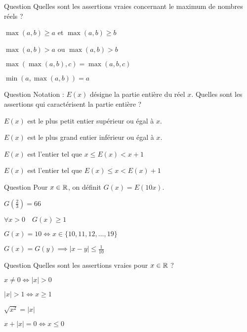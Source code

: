 \begin{multi}[multiple,feedback=
{\(\max(a,b) \ge a\) et \(\max(a,b) \ge b\) et \(\max( \max(a,b), c ) = \max(a,b,c)\). L'assertion "\(\max(a,b) > a\) ou \(\max(a,b) > b\)" est fausse (prendre \(a=b\)). Cherchez une preuve pour l'assertion restante !
}]{Question}
Quelles sont les assertions vraies concernant le maximum de nombres réels ?

    \item* \(\max(a,b) \ge a\) et \(\max(a,b) \ge b\)
    \item \(\max(a,b) > a\) ou \(\max(a,b) > b\)
    \item* \(\max( \max(a,b), c ) = \max(a,b,c)\)
    \item* \(\min(a, \max(a,b)) = a\)
\end{multi}


\begin{multi}[multiple,feedback=
{\(E(x)\) est le plus grand entier inférieur ou égal à \(x\), ce qui se caractérise aussi par \(E(x) \le x < E(x)+1\).
}]{Question}
Notation : \(E(x)\) désigne la partie entière du réel \(x\).
Quelles sont les assertions qui caractérisent la partie entière ?

    \item \(E(x)\) est le plus petit entier supérieur ou égal à \(x\).
    \item* \(E(x)\) est le plus grand entier inférieur ou égal à \(x\).
    \item \(E(x)\) est l'entier tel que \(x \le E(x) < x+1\)
    \item* \(E(x)\) est l'entier tel que \(E(x) \le x < E(x)+1\)
\end{multi}


\begin{multi}[multiple,feedback=
{La fonction \(G\) est très similaire à la fonction partie entière.
}]{Question}
Pour \(x\in \mathbb{R}\), on définit \(G(x) = E(10x)\).

    \item \(G(\frac23) = 66\)
    \item \(\forall x>0 \quad G(x) \ge 1\)
    \item \(G(x)=10 \iff x \in\{10,11,12,\ldots,19\}\)
    \item* \(G(x)=G(y) \implies |x-y| \le \frac{1}{10}\)
\end{multi}


\begin{multi}[multiple,feedback=
{L'assertion \(|x|>1 \iff x \ge 1\) est fausse, car  "\(|x| >1\)" est en fait équivalent à "\(x>1\) ou \(x<-1\)".
}]{Question}
Quelles sont les assertions vraies pour \(x\in\mathbb{R}\) ?

    \item* \(x\neq 0 \iff |x|>0\)
    \item \(|x|>1 \iff x \ge 1\)
    \item* \(\sqrt{x^2} = |x|\)
    \item* \(x+|x|=0 \iff x \le 0\)
\end{multi}


